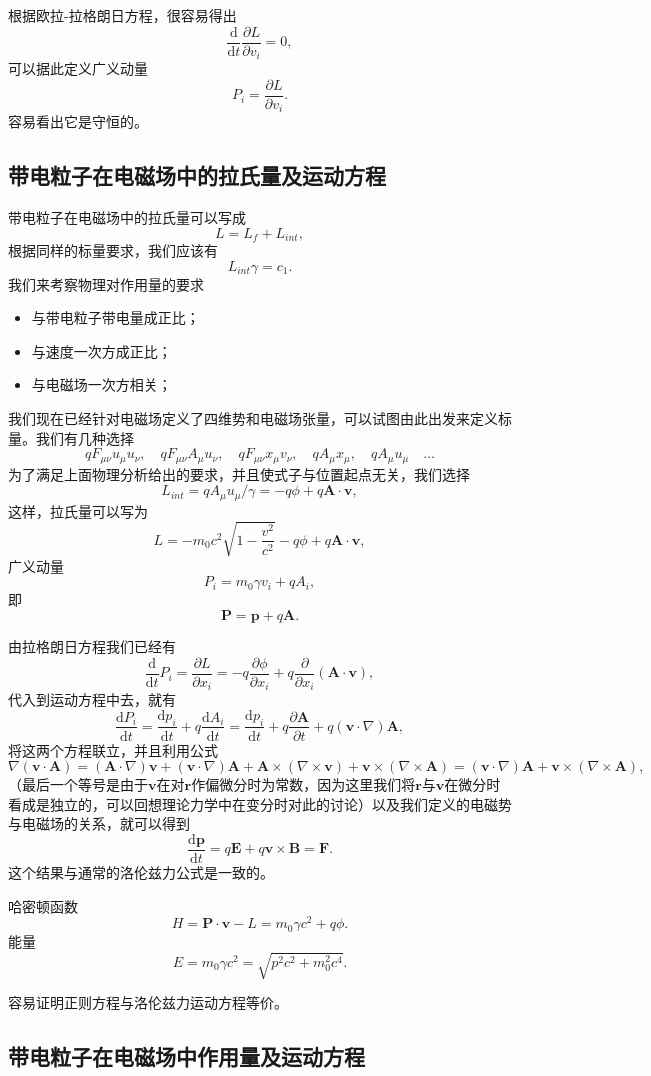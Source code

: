 \documentclass[UTF8]{ctexbook}
\renewcommand{\d}{\mathrm{d}}
\renewcommand{\b}{\boldsymbol}
\numberwithin{equation}{chapter}
\begin{document}
	根据欧拉-拉格朗日方程，很容易得出
	\[\frac{\d }{\d t}\frac{\partial L}{\partial v_i}=0,\]
	可以据此定义广义动量
	\[P_i=\frac{\partial L}{\partial v_i}.\]
	容易看出它是守恒的。
	
	\subsection{带电粒子在电磁场中的拉氏量及运动方程}
	带电粒子在电磁场中的拉氏量可以写成
	\[L=L_f+L_{int},\]
	根据同样的标量要求，我们应该有
	\[L_{int} \gamma=c_1.\]
	我们来考察物理对作用量的要求
	\begin{itemize}
		\item 与带电粒子带电量成正比；
		\item 与速度一次方成正比；
		\item 与电磁场一次方相关；
	\end{itemize}
	我们现在已经针对电磁场定义了四维势和电磁场张量，可以试图由此出发来定义标量。我们有几种选择
	\[qF_{\mu\nu}u_\mu u_\nu,\quad qF_{\mu\nu}A_\mu u_\nu,\quad q F_{\mu\nu} x_\mu v_\nu,\quad qA_\mu x_\mu ,\quad qA_\mu u_\mu \quad \dots\]
	为了满足上面物理分析给出的要求，并且使式子与位置起点无关，我们选择
	\[L_{int}=qA_\mu u_\mu/\gamma=-q\phi+q\b{A}\cdot\b{v},\]
	这样，拉氏量可以写为
	\[L=-m_0c^2\sqrt{1-\frac{v^2}{c^2}}-q\phi+q\b{A}\cdot\b{v},\]
	广义动量
	\[P_i=m_0\gamma v_i+qA_i,\]
	即
	\[\b{P}=\b{p}+q\b{A}.\]
	
	由拉格朗日方程我们已经有
	\[\frac{\d }{\d t}P_i=\frac{\partial L}{\partial x_i}=-q\frac{\partial \phi}{\partial x_i}+q\frac{\partial }{\partial x_i}(\b{A}\cdot\b{v}),\]
	代入到运动方程中去，就有
	\[\frac{\d P_i}{\d t}=\frac{\d p_i}{\d t}+q\frac{\d A_i}{\d t}=\frac{\d p_i}{\d t}+q\frac{\partial \b{A}}{\partial t}+q(\b{v}\cdot\nabla)\b{A},\]
	将这两个方程联立，并且利用公式
	\[\nabla(\b{v}\cdot\b{A})=(\b{A}\cdot\nabla)\b{v}+(\b{v}\cdot\nabla)\b{A}+\b{A}\times(\nabla\times\b{v})+\b{v}\times(\nabla\times\b{A})=(\b{v}\cdot\nabla)\b{A}+\b{v}\times(\nabla\times\b{A}),\]
	（最后一个等号是由于$\b{v}$在对$\b{r}$作偏微分时为常数，因为这里我们将$\b{r}$与$\b{v}$在微分时看成是独立的，可以回想理论力学中在变分时对此的讨论）以及我们定义的电磁势与电磁场的关系，就可以得到
	\[\frac{\d \b{p}}{\d t}=q\b{E}+q \b{v}\times\b{B}=\b{F}.\]
	这个结果与通常的洛伦兹力公式是一致的。
	
	哈密顿函数
	\[H=\b{P}\cdot\b{v}-L=m_0\gamma c^2+q\phi.\]
	能量
	\[E=m_0\gamma c^2=\sqrt{p^2 c^2+m_0^2c^4}.\]
	
	容易证明正则方程与洛伦兹力运动方程等价。
	
	\subsection{带电粒子在电磁场中作用量及运动方程}
	
\end{document}
